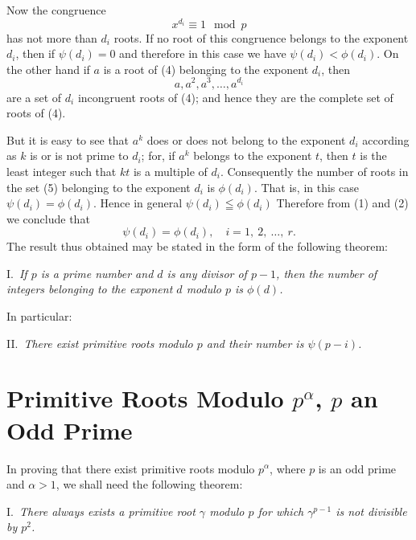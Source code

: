 \documentclass[oneside]{book}
\begin{document}
Now the congruence
\begin{equation}
x^{d_i} \equiv 1 \mod p \tag{4}
\end{equation}
has not more than $d_i$ roots. If no root of this congruence belongs
to the exponent $d_i$, then if $\psi(d_i) = 0$ and therefore in this
case we have $\psi(d_i) < \phi(d_i)$. On the other hand if $a$ is a
root of (4) belonging to the exponent $d_i$, then
\begin{equation}
a, a^2, a^3, \ldots, a^{d_i} \tag{5}
\end{equation}
are a set of $d_i$ incongruent roots of (4); and hence they are the
complete set of roots of (4).

But it is easy to see that $a^k$ does or does not belong to the
exponent $d_i$ according as $k$ is or is not prime to $d_i$; for, if
$a^k$ belongs to the exponent $t$, then $t$ is the least integer
such that $kt$ is a multiple of $d_i$. Consequently the number of
roots in the set (5) belonging to the exponent $d_i$ is $\phi(d_i)$.
That is, in this case $\psi(d_i) = \phi(d_i)$. Hence in general
$\psi(d_i) \leqq \phi(d_i)$ Therefore from (1) and (2) we conclude
that
\begin{equation*}
\psi(d_i) = \phi(d_i), \quad i = 1,\ 2,\ \ldots,\ r.
\end{equation*}
The result thus obtained may be stated in the form of the following
theorem:

\smallskip I.~\emph{If $p$ is a prime number and $d$ is any divisor
of $p-1$, then the number of integers belonging to the exponent $d$
modulo $p$ is $\phi(d)$.}

In particular:

\smallskip II.~\emph{There exist primitive roots modulo $p$ and their
number is $\psi(p-i)$.}

\section{Primitive Roots Modulo $p^\alpha$, $p$ an Odd
Prime}\label{s36}

In proving that there exist primitive roots modulo $p^\alpha$, where
$p$ is an odd prime and $\alpha > 1$, we shall need the following
theorem:

I.~\emph{There always exists a primitive root $\gamma$ modulo $p$
for which $\gamma^{p-1}$ is not divisible by $p^2$.}
\end{document}
